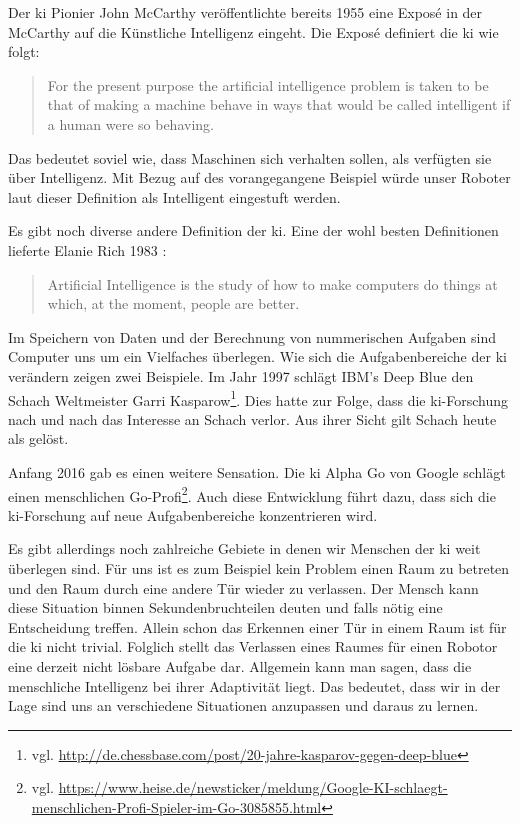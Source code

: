 Der \ac{ki} Pionier John McCarthy \cite{PROPOSALMcCarthy} veröffentlichte bereits 1955 eine Exposé in der McCarthy auf die Künstliche Intelligenz eingeht. Die Exposé definiert die \ac{ki} wie folgt:
\begin{quote}
		For the present purpose the artificial intelligence problem is taken to be that of making a machine behave in ways that would be called intelligent if a human were so behaving.
\end{quote}
Das bedeutet soviel wie, dass Maschinen sich verhalten sollen, als verfügten sie über Intelligenz. Mit Bezug auf des vorangegangene Beispiel würde unser Roboter laut dieser Definition als Intelligent eingestuft werden.

Es gibt noch diverse andere Definition der \ac{ki}. Eine der wohl besten Definitionen lieferte Elanie Rich 1983 \cite{ArtificialIntelligence}: 
\begin{quote}
		Artificial Intelligence is the study of how to make computers do things at which, at the moment, people are better.
\end{quote}

Im Speichern von Daten und der Berechnung von nummerischen Aufgaben sind Computer uns um ein Vielfaches überlegen. 
Wie sich die Aufgabenbereiche der \ac{ki} verändern zeigen zwei Beispiele. Im Jahr 1997 schlägt IBM's Deep Blue den Schach Weltmeister Garri Kasparow\footnote{vgl. \url{http://de.chessbase.com/post/20-jahre-kasparov-gegen-deep-blue}}. Dies hatte zur Folge, dass die \ac{ki}-Forschung nach und nach das Interesse an Schach verlor. Aus ihrer Sicht gilt Schach heute als gelöst. 

Anfang 2016 gab es einen weitere Sensation. Die \ac{ki} Alpha Go von Google schlägt einen menschlichen Go-Profi\footnote{vgl. \url{https://www.heise.de/newsticker/meldung/Google-KI-schlaegt-menschlichen-Profi-Spieler-im-Go-3085855.html}}. Auch diese Entwicklung führt dazu, dass sich die \ac{ki}-Forschung auf neue Aufgabenbereiche konzentrieren wird. 

Es gibt allerdings noch zahlreiche Gebiete in denen wir Menschen der \ac{ki} weit überlegen sind. Für uns ist es zum Beispiel kein Problem einen Raum zu betreten und den Raum durch eine andere Tür wieder zu verlassen. Der Mensch kann diese Situation binnen Sekundenbruchteilen deuten und falls nötig eine Entscheidung treffen. Allein schon das Erkennen einer Tür in einem Raum ist für die \ac{ki} nicht trivial. Folglich stellt das Verlassen eines Raumes für einen Robotor eine derzeit nicht lösbare Aufgabe dar. \linebreak
Allgemein kann man sagen, dass die menschliche Intelligenz bei ihrer Adaptivität liegt. Das bedeutet, dass wir in der Lage sind uns an verschiedene Situationen anzupassen und daraus zu lernen.   

